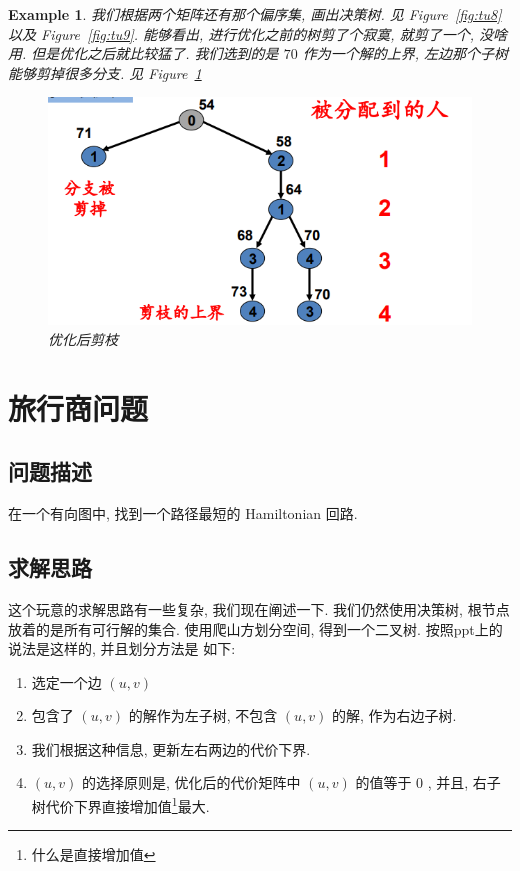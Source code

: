 \documentclass[a4paper, 10pt]{ctexart} %
\newtheorem{example}{Example}
\begin{document}
\begin{example}
我们根据两个矩阵还有那个偏序集, 画出决策树. 见 Figure~\ref{fig:tu8} 以及 Figure~\ref{fig:tu9}.
能够看出, 进行优化之前的树剪了个寂寞, 就剪了一个, 没啥用. 但是优化之后就比较猛了. 
我们选到的是 $70$ 作为一个解的上界, 左边那个子树能够剪掉很多分支. 见 Figure~\ref{fig:tu10}
\begin{figure}
    \centering
    \includegraphics[scale = 0.5]{ss9.png}
    \caption{优化后剪枝}
    \label{fig:tu10}
\end{figure}
\end{example}
\section{旅行商问题}
\subsection{问题描述}
在一个有向图中, 找到一个路径最短的 Hamiltonian 回路.
\subsection{求解思路} %
\label{sub:silu}
这个玩意的求解思路有一些复杂, 
我们现在阐述一下.
我们仍然使用决策树, 根节点放着的是所有可行解的集合.
使用爬山方划分空间, 
得到一个二叉树. 按照ppt上的说法是这样的, 并且划分方法是
如下:
\begin{enumerate}
    \item 选定一个边 $\left(u  ,v\right)$
    \item 包含了 $\left( u ,v\right) $ 的解作为左子树, 
    不包含 $\left( u ,v\right)$ 的解, 作为右边子树.
    \item 我们根据这种信息, 更新左右两边的代价下界. 
    \item $\left( u ,v\right)$ 的选择原则是, 优化后的代价矩阵中 $ \left( u ,v\right)$ 
    的值等于 $0$ , 并且, 右子树代价下界直接增加值\footnote{什么是直接增加值}最大.
\end{enumerate}
\end{document}
